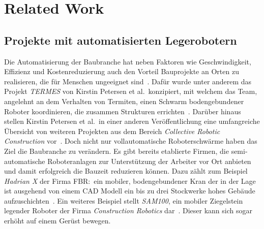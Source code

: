 \chapter{Related Work}\label{related}

\section{Projekte mit automatisierten Legerobotern}
Die Automatisierung der Baubranche hat neben Faktoren wie Geschwindigkeit, Effizienz und Kostenreduzierung auch den Vorteil Bauprojekte an Orten zu realisieren, die für Menschen ungeeignet sind~\cite{Petersen2012}.
Dafür wurde unter anderem das Projekt \textit{TERMES} von Kirstin Petersen et al.\ konzipiert, mit welchem das Team, angelehnt an dem Verhalten von Termiten, einen Schwarm bodengebundener Roboter koordinieren, die zusammen Strukturen errichten~\cite{Petersen2012}.
Darüber hinaus stellen Kirstin Petersen et al.\ in einer anderen Veröffentlichung eine umfangreiche Übersicht von weiteren Projekten aus dem Bereich \textit{Collective Robotic Construction} vor~\cite{Petersen2019}.
Doch nicht nur vollautomatische Roboterschwärme haben das Ziel die Baubranche zu verändern.
Es gibt bereits etablierte Firmen, die semi-automatische Roboteranlagen zur Unterstützung der Arbeiter vor Ort anbieten und damit erfolgreich die Bauzeit reduzieren können.
Dazu zählt zum Beispiel \textit{Hadrian X} der Firma FBR:\ ein mobiler, bodengebundener Kran der in der Lage ist ausgehend von einem CAD Modell ein bis zu drei Stockwerke hohes Gebäude aufzuschichten~\cite{HadrianX}.
Ein weiteres Beispiel stellt \textit{SAM100}, ein mobiler Ziegelstein legender Roboter der Firma \textit{Construction Robotics} dar~\cite{SAM}.
Dieser kann sich sogar erhöht auf einem Gerüst bewegen.

